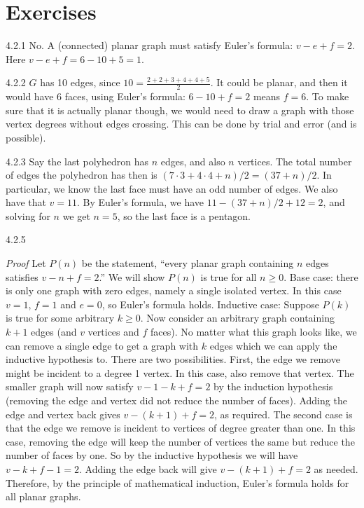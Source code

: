 \documentclass[11pt,]{book}
\makeatletter
\theoremstyle{ptxplainnotitle}
\theoremstyle{ptxplaintitle}
\renewcommand*{\proofname}{Proof}
\renewenvironment{proof}[1][\proofname]{\par
  \pushQED{\qed}%
  \normalfont \topsep6\p@\@plus6\p@\relax
  \trivlist
  \item\relax
    {\itshape
    #1\@addpunct{.}}\hspace\labelsep\ignorespaces
}{%
  \popQED\endtrivlist\@endpefalse
}
\theoremstyle{ptxdefinitionnotitle}
\theoremstyle{ptxdefinitiontitle}
\theoremstyle{ptxdefinitionnotitle}
\theoremstyle{ptxdefinitiontitle}
\theoremstyle{ptxdefinitionnotitle}
\theoremstyle{ptxdefinitiontitle}
\theoremstyle{ptxdefinitiontitlenonumber}
\theoremstyle{ptxdefinitiontitlenonumber}
\numberwithin{equation}{chapter}
\makeatother
\begin{document}
\section*{Exercises}
\begin{divisionexercise}{4.2.1}
\textbf{}\hypertarget{p-2625}{}%
No. A (connected) planar graph must satisfy Euler's formula: \(v - e + f = 2\). Here \(v - e + f = 6 - 10 + 5 = 1\).%
\end{divisionexercise}%
\begin{divisionexercise}{4.2.2}
\textbf{}\hypertarget{p-2627}{}%
\(G\) has 10 edges, since \(10 = \frac{2+2+3+4+4+5}{2}\). It could be planar, and then it would have 6 faces, using Euler's formula: \(6-10+f = 2\) means \(f = 6\).  To make sure that it is actually planar though, we would need to draw a graph with those vertex degrees without edges crossing.  This can be done by trial and error (and is possible).%
\end{divisionexercise}%
\begin{divisionexercise}{4.2.3}
\textbf{}\hypertarget{p-2629}{}%
Say the last polyhedron has \(n\) edges, and also \(n\) vertices. The total number of edges the polyhedron has then is \((7 \cdot 3 + 4 \cdot 4 + n)/2 = (37 + n)/2\). In particular, we know the last face must have an odd number of edges. We also have that \(v = 11 \).  By Euler's formula, we have \(11 - (37+n)/2 + 12 = 2\), and solving for \(n\) we get \(n = 5\), so the last face is a pentagon.%
\end{divisionexercise}%
\begin{divisionexercise}{4.2.5}
\textbf{}\begin{proof}\hypertarget{proof-43}{}
\hypertarget{p-2635}{}%
Let \(P(n)\) be the statement, ``every planar graph containing \(n\) edges satisfies \(v - n + f = 2\).'' We will show \(P(n)\) is true for all \(n \ge 0\). Base case: there is only one graph with zero edges, namely a single isolated vertex. In this case \(v = 1\), \(f = 1\) and \(e = 0\), so Euler's formula holds. Inductive case: Suppose \(P(k)\) is true for some arbitrary \(k \ge 0\). Now consider an arbitrary graph containing \(k+1\) edges (and \(v\) vertices and \(f\) faces). No matter what this graph looks like, we can remove a single edge to get a graph with \(k\) edges which we can apply the inductive hypothesis to. There are two possibilities. First, the edge we remove might be incident to a degree 1 vertex. In this case, also remove that vertex. The smaller graph will now satisfy \(v-1 - k + f = 2\) by the induction hypothesis (removing the edge and vertex did not reduce the number of faces). Adding the edge and vertex back gives \(v - (k+1) + f = 2\), as required. The second case is that the edge we remove is incident to vertices of degree greater than one. In this case, removing the edge will keep the number of vertices the same but reduce the number of faces by one. So by the inductive hypothesis we will have \(v - k + f-1 = 2\). Adding the edge back will give \(v - (k+1) + f = 2\) as needed. Therefore, by the principle of mathematical induction, Euler's formula holds for all planar graphs.%
\end{proof}
\end{divisionexercise}%
\end{document}
